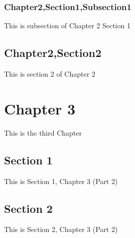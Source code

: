 \documentclass[letterpaper,10pt,english]{sphinxmanual}
\begin{document}
\subsubsection{Chapter2,Section1,Subsection1}
\label{\detokenize{part1/chapter2:chapter2-section1-subsection1}}
This is subsection of Chapter 2 Section 1


\subsection{Chapter2,Section2}
\label{\detokenize{part1/chapter2:chapter2-section2}}
This is section 2 of Chapter 2


\section{Chapter 3}
\label{\detokenize{part2/chapter3:chapter-3}}\label{\detokenize{part2/chapter3::doc}}
This is the third Chapter


\subsection{Section 1}
\label{\detokenize{part2/chapter3-section1:section-1}}\label{\detokenize{part2/chapter3-section1::doc}}
This is Section 1, Chapter 3 (Part 2)


\subsection{Section 2}
\label{\detokenize{part2/chapter3-section2:section-2}}\label{\detokenize{part2/chapter3-section2::doc}}
This is Section 2, Chapter 3 (Part 2)







\renewcommand{\indexname}{Index}
\printindex
\end{document}
